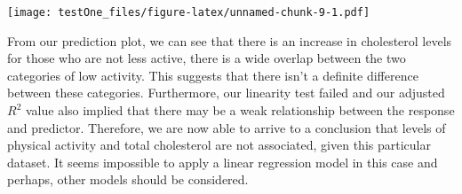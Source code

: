 \documentclass[
]{article}
\begin{document}
\texttt{[image: testOne\_files/figure-latex/unnamed-chunk-9-1.pdf]}

From our prediction plot, we can see that there is an increase in
cholesterol levels for those who are not less active, there is a wide
overlap between the two categories of low activity. This suggests that
there isn't a definite difference between these categories. Furthermore,
our linearity test failed and our adjusted \(R^2\) value also implied
that there may be a weak relationship between the response and
predictor. Therefore, we are now able to arrive to a conclusion that
levels of physical activity and total cholesterol are not associated,
given this particular dataset. It seems impossible to apply a linear
regression model in this case and perhaps, other models should be
considered.
\end{document}
